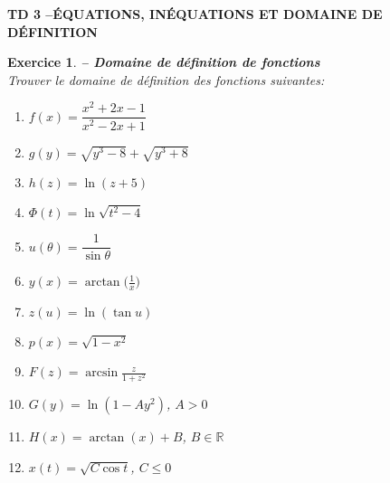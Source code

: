\documentclass[a4paper,11pt]{article}
\newenvironment{alphate}{\begin{enumerate}[label=\alph*)]}{\end{enumerate}}
\newtheorem{exo}{Exercice}
\newenvironment{exercice}{\begin{exo} \em}{\end{exo}}
\begin{document}



\begin{center}
{\bf TD 3 \quad--\quad \'EQUATIONS, IN\'EQUATIONS ET DOMAINE DE 
D\'EFINITION}
\end{center}
\bigskip 

\addtocounter{exo}{14}


\begin{exercice} {\bf -- Domaine de d\'efinition de fonctions}
\label{TD6-domaine}\\ 
Trouver le domaine de d\'efinition des fonctions suivantes:
\begin{multicols}{3}
\begin{alphate}
\item $f(x)=\dfrac{x^2+2x-1}{x^2-2x+1}$ \smallskip 
\item $g(y)=\sqrt{y^3-8}+\sqrt{y^3+8}$ \smallskip 
\item $h(z)=\ln(z+5)$ \smallskip 
\item $\Phi(t)=\ln\sqrt{t^2-4}$
\item $u(\theta)=\dfrac{1}{\sin\theta}$ \smallskip 
\item $y(x)=\arctan \big(\frac{1}{x}\big)$ \smallskip 
\item $z(u)=\ln(\tan u)$ \smallskip 
\item $p(x)=\sqrt{1-x^2}$

\item $F(z)=\arcsin \frac{z}{1+z^2}$ \smallskip 
\item $G(y)=\ln(1-Ay^2)$, $A>0$ \smallskip 
\item $H(x)=\arctan(x) + B$, $B \in \mathbb{R}$ \smallskip 
\item $x(t)=\sqrt{C\cos t}$, $C\leq0$ 

\end{alphate}
\end{multicols}
\end{exercice}
\bigskip

\end{document}
